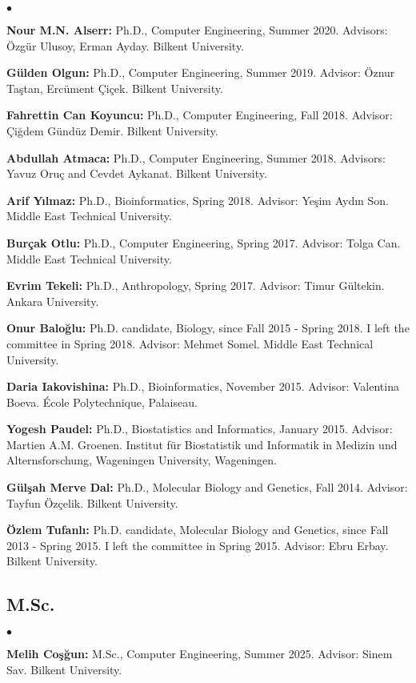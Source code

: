 \documentclass[margin,line]{res}
\newenvironment{list2}{
  \begin{list}{$\bullet$}{%
      \setlength{\itemsep}{0.1cm}
      \setlength{\parsep}{0in} \setlength{\parskip}{0in}
      \setlength{\topsep}{0in} \setlength{\partopsep}{0in} 
      \setlength{\leftmargin}{0.2in}}}{\end{list}}
\begin{document}
\begin{resume}
\begin{list2}
\item 
{\bf  Nour M.N. Alserr:} Ph.D., Computer Engineering, Summer 2020.
  Advisors: Özgür Ulusoy, Erman Ayday.
  Bilkent University.
\item
  {\bf Gülden Olgun:} Ph.D., Computer Engineering, Summer 2019.
  Advisor: Öznur Taştan, Ercüment Çiçek.
  Bilkent University.
\item
  {\bf Fahrettin Can Koyuncu:} Ph.D., Computer Engineering, Fall 2018.
  Advisor: Çiğdem Gündüz Demir.
  Bilkent University.
\item
  {\bf Abdullah Atmaca:} Ph.D., Computer Engineering, Summer 2018.
  Advisors: Yavuz Oruç and Cevdet Aykanat.
  Bilkent University.
\item
  {\bf Arif Yılmaz:} Ph.D., Bioinformatics, Spring 2018.
  Advisor: Yeşim Aydın Son.
  Middle East Technical University.
\item 
  {\bf Burçak Otlu:} Ph.D., Computer Engineering, Spring 2017.
  Advisor: Tolga Can.
  Middle East Technical University. 
\item 
  {\bf Evrim Tekeli:} Ph.D., Anthropology,  Spring 2017.
  Advisor: Timur G\"{u}ltekin.
  Ankara University. 
\item
  {\bf Onur Baloğlu:} Ph.D. candidate, Biology, since Fall 2015 - Spring 2018. I left the committee in Spring 2018.
  Advisor: Mehmet Somel.
  Middle East Technical University.
\item
  {\bf Daria Iakovishina:} Ph.D., Bioinformatics,  November 2015.
  Advisor:  Valentina Boeva.
  École Polytechnique, Palaiseau. %


\item
  {\bf Yogesh Paudel:} Ph.D., Biostatistics and Informatics,  January 2015.
  Advisor: Martien A.M. Groenen.
  Institut für Biostatistik und Informatik in Medizin und Alternsforschung,  Wageningen University, Wageningen.%
  
\item
  {\bf G\"{u}l\c{s}ah Merve Dal:} Ph.D., Molecular Biology and Genetics, Fall 2014.
  Advisor: Tayfun Özçelik.
  Bilkent University. 
\item
  {\bf Özlem Tufanlı:} Ph.D. candidate, Molecular Biology and Genetics, since Fall 2013 - Spring 2015. I left the committee in Spring 2015.
  Advisor: Ebru Erbay.
  Bilkent University.
  \end{list2}

\vspace*{-.4cm}
\subsection{\small \sc M.Sc.}
\begin{list2}
\item
  {\bf Melih Coşğun:} M.Sc., Computer Engineering, Summer 2025.
  Advisor: Sinem Sav.
  Bilkent University.


\end{list2}
\end{resume}
\end{document}
